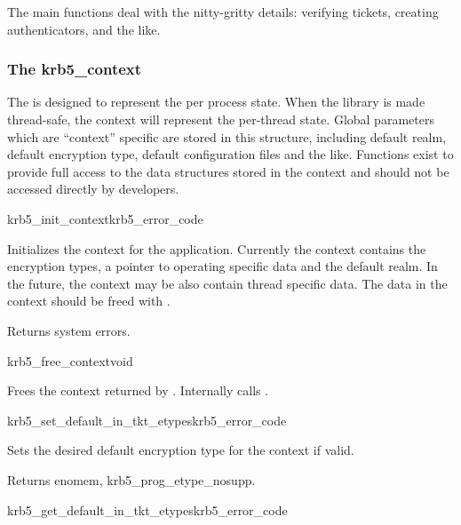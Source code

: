 The main functions deal with the nitty-gritty details: verifying
tickets, creating authenticators, and the like.

\subsubsection{The krb5_context}
The  is designed to represent the per process
state. When the library is made thread-safe, the context will represent
the per-thread state. Global parameters which are ``context'' specific
are stored in this structure, including default realm, default
encryption type, default configuration files and the like. Functions
exist to provide full access to the data structures stored in the
context and should not be accessed directly by developers.

\begin{funcdecl}{krb5_init_context}{krb5_error_code}{\funcout}
\end{funcdecl}

Initializes the context  for the
application. Currently the context contains the encryption types, a
pointer to operating specific data and the default realm. In the future,
the context may be also contain thread specific data.  The data in the
context should be freed with .

Returns system errors.

\begin{funcdecl}{krb5_free_context}{void}{\funcinout}
\end{funcdecl}

Frees the context returned by . Internally
calls .

\begin{funcdecl}{krb5_set_default_in_tkt_etypes}{krb5_error_code}{\funcinout}
\funcin
{}
\end{funcdecl}

Sets the desired default encryption type  for the context
if valid.

Returns {\sc enomem}, {\sc krb5_prog_etype_nosupp}.

\begin{funcdecl}{krb5_get_default_in_tkt_etypes}{krb5_error_code}{\funcinout}
\funcout
{}
\end{funcdecl}

